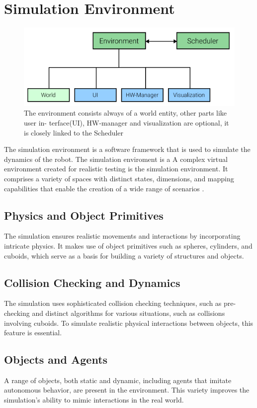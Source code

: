 \section{Simulation Environment}
\begin{figure}[h]
	\centering
	\includegraphics[width=.5\textwidth]{Block Diagram of Simulation Environment}
	\caption{ The environment consists always of a world entity, other parts like user in-
terface(UI), HW-manager and visualization are optional, it is closely linked to
the Scheduler \cite{Bachlorsthesis}}
	\label{fig:Block diagram of the simulation environment}
\end{figure}
The simulation environment is a software framework that is used to simulate the dynamics of the robot. The simulation enviroment is a A complex virtual environment created for realistic testing is the simulation environment. It comprises a variety of spaces with distinct states, dimensions, and mapping capabilities that enable the creation of a wide range of scenarios \cite{Bachlorsthesis}.
\subsection{Physics and Object Primitives}
The simulation ensures realistic movements and interactions by incorporating intricate physics. It makes use of object primitives such as spheres, cylinders, and cuboids, which serve as a basis for building a variety of structures and objects\cite{Bachlorsthesis}.
\subsection{Collision Checking and Dynamics}
The simulation uses sophisticated collision checking techniques, such as pre-checking and distinct algorithms for various situations, such as collisions involving cuboids. To simulate realistic physical interactions between objects, this feature is essential\cite{Bachlorsthesis}.
\subsection{Objects and Agents}
A range of objects, both static and dynamic, including agents that imitate autonomous behavior, are present in the environment. This variety improves the simulation's ability to mimic interactions in the real world.
